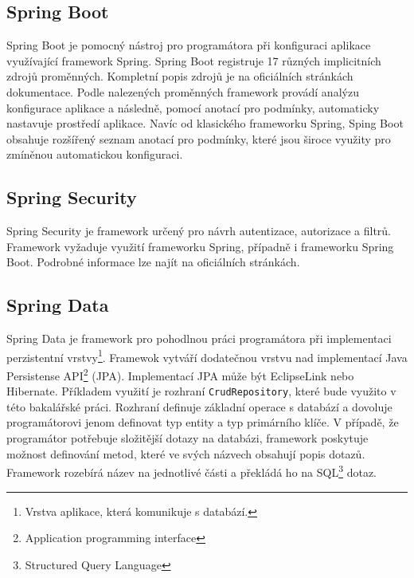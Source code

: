     \subsection{Spring Boot}
        Spring Boot je pomocný nástroj pro programátora při konfiguraci aplikace využívající framework Spring. Spring Boot registruje 17 různých implicitních zdrojů proměnných. Kompletní popis zdrojů je na oficiálních stránkách dokumentace\cite{spring-property-sources}. Podle nalezených proměnných framework provádí analýzu konfigurace aplikace a následně, pomocí anotací pro podmínky, automaticky nastavuje prostředí aplikace. Navíc od klasického frameworku Spring, Sping Boot obsahuje rozšířený seznam anotací pro podmínky, které jsou široce využity pro zmíněnou automatickou konfiguraci.\cite{spring-boot}
    
    \subsection{Spring Security}
        Spring Security je framework určený pro návrh autentizace, autorizace a filtrů. Framework vyžaduje využití frameworku Spring, případně i frameworku Spring Boot. Podrobné informace lze najít na oficiálních stránkách\cite{spring-security}.
    
    \subsection{Spring Data}
        Spring Data je framework pro pohodlnou práci programátora při implementaci perzistentní vrstvy\footnote{Vrstva aplikace, která komunikuje s databází.}. Framewok vytváří dodatečnou vrstvu nad implementací Java Persistense API\footnote{Application programming interface} (JPA). Implementací JPA může být EclipseLink nebo Hibernate. Příkladem využití je rozhraní \texttt{CrudRepository}, které bude využito v této bakalářské práci. Rozhraní definuje základní operace s databází a dovoluje programátorovi jenom definovat typ entity a typ primárního klíče. V případě, že programátor potřebuje složitější dotazy na databázi, framework poskytuje možnost definování metod, které ve svých názvech obsahují popis dotazů\cite{query-methods}. Framework rozebírá název na jednotlivé části a překládá ho na SQL\footnote{Structured Query Language} dotaz.
    
